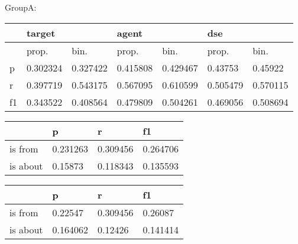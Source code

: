 \documentclass[a4paper, 12pt]{article}
\begin{document}
GroupA:\\
\begin{minipage}{\linewidth}
\centering
{}
\begin{tabular}{l|ll|ll|ll}
\hline
   & \multicolumn{2}{l}{target} & \multicolumn{2}{l}{agent} & \multicolumn{2}{l}{dse} \\ \hline
   & prop.& bin.& prop.& bin.& prop.& bin.\\
 \hline
p  &0.302324&0.327422& 0.415808 & 0.429467 & 0.43753  &  0.45922  \\
r  &0.397719&0.543175& 0.567095 & 0.610599 &0.505479  & 0.570115  \\
f1 &0.343522&0.408564& 0.479809 & 0.504261 &0.469056  & 0.508694  \\ \hline
\end{tabular}
\end{minipage}
\begin{minipage}{\linewidth}
\centering
{}
\begin{tabular}{l|l|l|l}
\hline
         & p & r & f1    \\\hline
is from  & 0.231263& 0.309456& 0.264706\\
is about &0.15873& 0.118343& 0.135593\\
\hline
\end{tabular}
\end{minipage}
\begin{minipage}{\linewidth}
  \centering
\begin{tabular}{l|l|l|l}
\hline
         & p & r & f1    \\\hline
is from  & 0.22547& 0.309456&  0.26087\\
is about &0.164062&  0.12426& 0.141414\\
\hline
\end{tabular}
\end{minipage}

\end{document}
